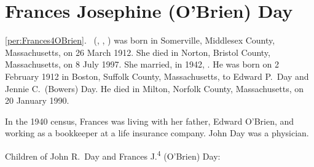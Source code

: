 \section{Frances Josephine (O'Brien) Day}

\ref{per:Frances4OBrien}.\  (, , ) was born in Somerville, Middlesex County, Massachusetts, on 26 March 1912.\cite{Frances4OBrien2Birth} She died in Norton, Bristol County, Massachusetts, on 8 July 1997.\cite{Frances4OBrien2Death,Frances4OBrien2Death2} She married, in 1942, .\cite{Frances4OBrien2Death,Frances4OBrien2Marriage} He was born on 2 February 1912 in Boston, Suffolk County, Massachusetts, to Edward P.\ Day and Jennie C.\ (Bowers) Day.\cite{JohnDaySS} He died in Milton, Norfolk County, Massachusetts, on 20 January 1990.\cite{JohnDaySS,JohnDayDeath}

In the 1940 census, Frances was living with her father, Edward O'Brien, and working as a bookkeeper at a life insurance company.\cite{Census1940Frances4OBrien2} John Day was a physician.\cite{JohnDayObit,JohnDay1948}

\begin{KidsIntro}
	Children of John R.\ Day and Frances J.\textsuperscript{4} (O'Brien) Day:
\end{KidsIntro}

\begin{Kids}
	
\end{Kids}